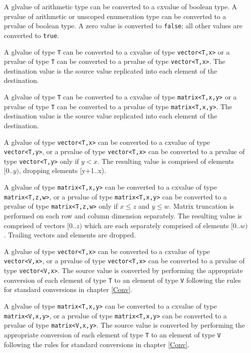 \p A glvalue of arithmetic type can be converted to a cxvalue of boolean type. A
prvalue of arithmetic or unscoped enumeration type can be converted to a prvalue
of boolean type. A zero value is converted to \texttt{false}; all other values
are converted to \texttt{true}.


\p A glvalue of type \texttt{T} can be converted to a cxvalue of type
\texttt{vector<T,x>} or a prvalue of type \texttt{T} can be converted to a
prvalue of type \texttt{vector<T,x>}. The destination value is the source value
replicated into each element of the destination.

\p A glvalue of type \texttt{T} can be converted to a cxvalue of type
\texttt{matrix<T,x,y>} or a prvalue of type \texttt{T} can be converted to a
prvalue of type \texttt{matrix<T,x,y>}. The destination value is the source
value replicated into each element of the destination.


\p A glvalue of type \texttt{vector<T,x>} can be converted to a cxvalue of type
\texttt{vector<T,y>}, or a prvalue of type \texttt{vector<T,x>} can be converted
to a prvalue of type \texttt{vector<T,y>} only if \( y < x \). The resulting
value is comprised of elements \( [0..y) \), dropping elements [y+1..x).

\p A glvalue of type \texttt{matrix<T,x,y>} can be converted to a cxvalue of type
\texttt{matrix<T,z,w>}, or a prvalue of type \texttt{matrix<T,x,y>} can be
converted to a prvalue of type \texttt{matrix<T,z,w>} only if \( x \leq z \)
and \(y \leq w \). Matrix truncation is performed on each row and column
dimension separately. The resulting value is comprised of vectors \( [0..z) \)
which are each separately comprised of elements \( [0..w) \). Trailing vectors
and elements are dropped.


\p A glvalue of type \texttt{vector<T,x>} can be converted to a cxvalue of type
\texttt{vector<V,x>}, or a prvalue of type \texttt{vector<T,x>} can be converted
to a prvalue of type \texttt{vector<V,x>}. The source value is converted by
performing the appropriate conversion of each element of type \texttt{T} to an
element of type \texttt{V} following the rules for standard conversions
in chapter \ref{Conv}.

\p A glvalue of type \texttt{matrix<T,x,y>} can be converted to a cxvalue of
type \texttt{matrix<V,x,y>}, or a prvalue of type \texttt{matrix<T,x,y>} can be
converted to a prvalue of type \texttt{matrix<V,x,y>}. The source value is
converted by performing the appropriate conversion of each element of type
\texttt{T} to an element of type \texttt{V} following the rules for standard
conversions in chapter \ref{Conv}.

